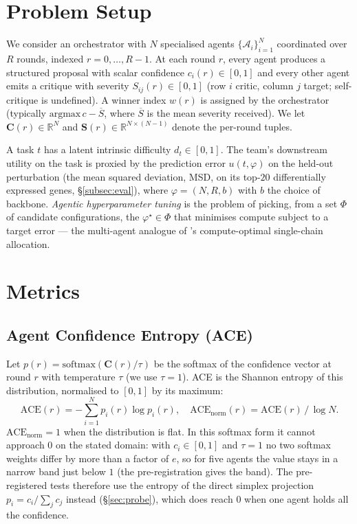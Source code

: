 \documentclass[10pt,a4paper]{article}
\begin{document}
\section{Problem Setup}\label{sec:setup}

We consider an orchestrator with $N$ specialised agents $\{\mathcal{A}_i\}_{i=1}^N$
coordinated over $R$ rounds, indexed $r = 0, \dots, R-1$. At each round $r$, every agent produces a
structured proposal with scalar confidence $c_i(r) \in [0,1]$ and every other
agent emits a critique with severity $S_{ij}(r) \in [0,1]$ (row $i$ critic,
column $j$ target; self-critique is undefined). A winner index $w(r)$ is
assigned by the orchestrator (typically $\mathrm{argmax}\, c - \overline{S}$,
where $\overline{S}$ is the mean severity received). We let
$\mathbf{C}(r)\!\in\!\mathbb{R}^N$ and $\mathbf{S}(r)\!\in\!\mathbb{R}^{N\times(N-1)}$
denote the per-round tuples.

A task $t$ has a latent intrinsic difficulty $d_t\!\in\![0,1]$. The team's
downstream utility on the task is proxied by the prediction error
$u(t, \varphi)$ on the held-out perturbation (the mean squared deviation, MSD, on its top-$20$
differentially expressed genes, \S\ref{subsec:eval}), where
$\varphi = (N, R, b)$ with $b$ the choice of backbone.
\emph{Agentic hyperparameter tuning} is the problem of picking, from a set
$\Phi$ of candidate configurations, the
$\varphi^\star\!\in\!\Phi$ that minimises compute subject to a target error ---
the multi-agent analogue of \citet{snell2024scaling}'s compute-optimal
single-chain allocation.

\section{Metrics}\label{sec:metrics}

\subsection{Agent Confidence Entropy (ACE)}

Let $p(r) = \mathrm{softmax}(\mathbf{C}(r)/\tau)$ be the softmax of the
confidence vector at round $r$ with temperature $\tau$ (we use $\tau=1$). ACE is the Shannon entropy of this distribution, normalised to
$[0,1]$ by its maximum:
\begin{equation}
  \mathrm{ACE}(r) = -\sum_{i=1}^{N} p_i(r) \log p_i(r),\quad
  \mathrm{ACE}_{\mathrm{norm}}(r) = \mathrm{ACE}(r)\,/\,\log N.
\end{equation}
$\mathrm{ACE}_{\mathrm{norm}}\!=\!1$ when the distribution is flat. In this softmax
form it cannot approach $0$ on the stated domain: with $c_i\in[0,1]$ and $\tau=1$
no two softmax weights differ by more than a factor of $e$, so for five agents the value
stays in a narrow band just below $1$ (the pre-registration gives the band). The pre-registered tests therefore use the entropy
of the direct simplex projection $p_i = c_i/\sum_j c_j$ instead
(\S\ref{sec:probe}), which does reach $0$ when one agent holds all the confidence.
\end{document}
